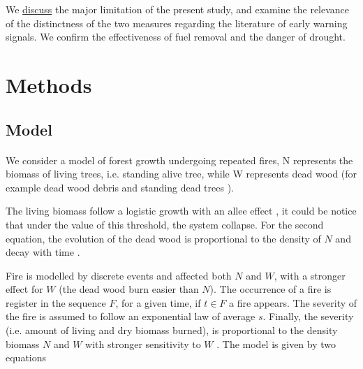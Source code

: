 \documentclass{article}
\begin{document}
We \hyperref[Discussion]{discuss} the major limitation of the present study, and examine the relevance of the distinctness of the two measures regarding the literature of early warning signals. We confirm the effectiveness of fuel removal and the danger of drought.








\newpage
\section{Methods}


\subsection{Model}

\label{dynamical_system}

\paragraph{}
We consider a model of forest growth undergoing repeated fires, N represents the biomass of living trees, i.e. standing alive tree, while W represents dead wood (for example dead wood debris and standing dead trees \citep{russell2015quantifying}). 

The living biomass follow a logistic growth \citep{tsoularis2002analysis, jensen1975comparison} with an allee effect \citep{stephens1999allee, amarasekare1998allee}, it could be notice that under the value of this threshold, the system collapse. For the second equation, the evolution of the dead wood is proportional to the density of $N$ and decay with time \citep{kahl_wood_2017, shorohova_stump_2012, christensen_estimation_1977, delaney_quantity_1998}.%

Fire is modelled by discrete events and affected both $N$ and $W$, with a stronger effect for $W$ (the dead wood burn easier than $N$). The occurrence of a fire is register in the sequence $F$, for a given time, if $t\in F$ a fire appears. The severity of the fire is assumed to follow an exponential law of average $s$. Finally, the severity (i.e. amount of living and dry biomass burned), is proportional to the density biomass $N$ and $W$ with stronger sensitivity to $W$ \citep{martinson_fuel_2013, safford_effects_2009, lecomte_effects_2006}. The model is given by two equations
\end{document}
